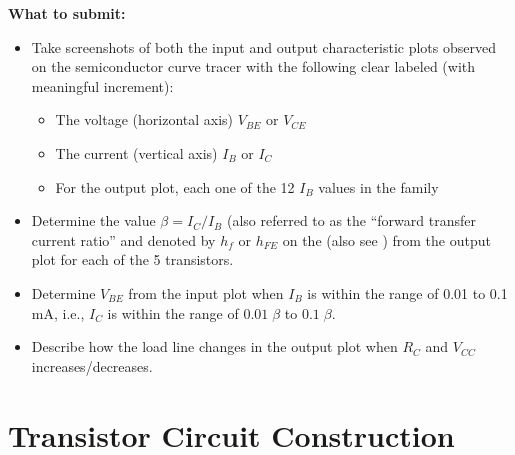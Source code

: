{\bf What to submit:}

\begin{itemize}
\item Take screenshots of both the input and output characteristic plots 
  observed on the semiconductor curve tracer with the following clear 
  labeled (with meaningful increment):
  \begin{itemize}
  \item The voltage (horizontal axis) $V_{BE}$ or $V_{CE}$
  \item The current (vertical axis) $I_B$ or $I_C$
  \item For the output plot, each one of the 12 $I_B$ values in the family
  \end{itemize}
\item Determine the value $\beta=I_C/I_B$ (also referred to as the 
  ``forward transfer current ratio'' and denoted by $h_f$ or $h_{FE}$ on
  the 
  (also see )
  from the output plot for each of the 5 transistors.
\item Determine $V_{BE}$ from the input plot when $I_B$ is within the range of
  0.01 to 0.1 mA, i.e., $I_C$ is within the range of $0.01\;\beta$ to $0.1\;\beta$.
\item Describe how the load line changes in the output plot when $R_C$ and $V_{CC}$
  increases/decreases.
\end{itemize}


\section{Transistor Circuit Construction}


